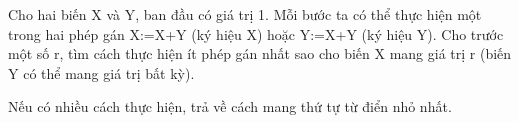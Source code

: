 Cho hai biến X và Y, ban đầu có giá trị 1. Mỗi bước ta có thể thực hiện một trong hai phép gán X:=X+Y (ký hiệu X) hoặc Y:=X+Y (ký hiệu Y). Cho trước một số r, tìm cách thực hiện ít phép gán nhất sao cho biến X mang giá trị r (biến Y có thể mang giá trị bất kỳ).  

   Nếu có nhiều cách thực hiện, trả về cách mang thứ tự từ điển nhỏ nhất.